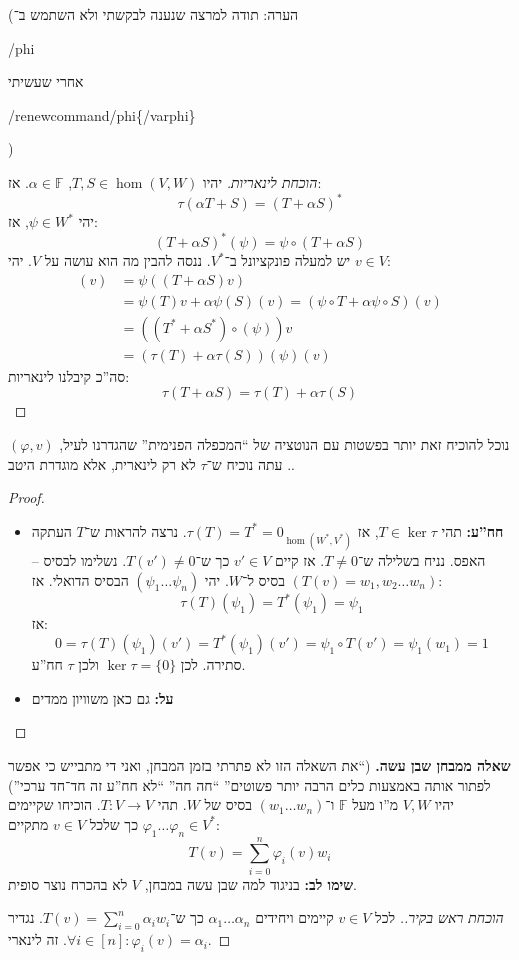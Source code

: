 \documentclass[a4paper]{article}
\newcommand\en[1] {\begin{otherlanguage}{english}#1\end{otherlanguage}}
\newcommand\sumni     {\sum_{i = 0}^{n}}
\newcommand\F         {\mathbb{F}}
\newcommand\co        {\colon}
\newcommand\ag        {\alpha}
\renewcommand\phi     {\varphi}
\theoremstyle{definition}
\begin{document}
	(הערה: תודה למרצה שנענה לבקשתי ולא השתמש ב־\en{\slash phi} אחרי שעשיתי \en{\slash renewcommand\slash phi\{\slash varphi\}})
	\begin{proof}[הוכחת לינאריות]
		יהיו $T, S \in \hom(V, W)$, $\ag \in \F$. אז: 
		\[ \tau(\ag T + S) = (T + \ag S)^* \]
		יהי $\psi \in W^*$, אז: 
		\[ (T + \ag S)^*(\psi) = \psi \circ (T + \ag S) \]
		יש למעלה פונקציונל ב־$V^*$. ננסה להבין מה הוא עושה על $V$. יהי $v \in V$: 
		\begin{align*}
			[\psi (T + \ag S)](v) &= \psi((T + \ag S)v) \\ 
			&= \psi(T)v + \ag \psi(S)(v) = (\psi\circ T + \ag \psi\circ S)(v) \\
			&= ((T^* + \ag S^*)\circ (\psi))v \\
			&= (\tau(T) + \ag \tau(S))(\psi)(v)
		\end{align*}
		סה''כ קיבלנו לינאריות: 
		\[ \tau(T + \ag S) = \tau(T) + \ag \tau(S) \]
	\end{proof}
	נוכל להוכיח זאת יותר בפשטות עם הנוטציה של ``המכפלה הפנימית'' שהגדרנו לעיל, $(\phi, v)$. 
	עתה נוכיח ש־$\tau$ לא רק לינארית, אלא מוגדרת היטב. 
	\begin{proof}\,
		\begin{itemize}
			\item \textbf{חח''ע: }תהי $T \in \ker \tau$, אז $\tau(T) = T^* = 0_{\hom(W^*, V^*)}$. נרצה להראות ש־$T$ העתקה האפס. נניח בשלילה ש־$T \neq 0$. אז קיים $v' \in V$ כך ש־$T(v') \neq 0$. נשלימו לבסיס – $(T(v) = w_1, w_2 \dots w_n)$ בסיס ל־$W$. יהי $(\psi_1 \dots \psi_n)$ הבסיס הדואלי. אז:
			\[ \tau(T)(\psi_1) = T^*(\psi_1) = \psi_1  \]
			אז: 
			\[ 0 = \tau(T)(\psi_1)(v') = T^*(\psi_1)(v') = \psi_1 \circ T(v') = \psi_1(w_1) = 1 \]
			סתירה. לכן $\ker \tau = \{0\}$ ולכן $\tau$ חח''ע. 
			\item \textbf{על: }גם כאן משוויון ממדים
		\end{itemize}
	\end{proof}
	
	\textbf{שאלה ממבחן שבן עשה. }(``את השאלה הזו לא פתרתי בזמן המבחן, ואני די מתבייש כי אפשר לפתור אותה באמצעות כלים הרבה יותר פשוטים'' ``חה חה'' ``לא חח''ע זה חד־חד ערכי'') יהיו $V, W$ מ''ו מעל $\F$ ו־$(w_1 \dots w_n)$ בסיס של $W$. תהי $T \co V \to V$. הוכיחו שקיימים $\phi_1 \dots \phi_n \in V^*$ כך שלכל $v \in V$ מתקיים: 
	\[ T(v) = \sumni \phi_i(v) w_i \]
	\textbf{שימו לב: }בניגוד למה שבן עשה במבחן, $V$ לא בהכרח נוצר סופית. 
	\begin{proof}[הוכחת ראש בקיר.]
		לכל $v \in V$ קיימים ויחידים $\ag_1 \dots \ag_n$ כך ש־$T(v) = \sumni \ag_i w_i$. נגדיר $\forall i \in [n] \co \phi_i(v) = \ag_i$. זה לינארי. 
	\end{proof}
	
\end{document}
